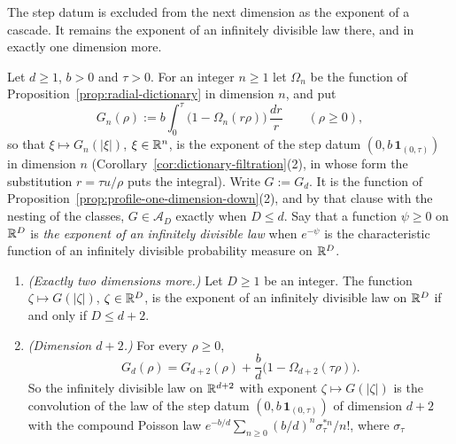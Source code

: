 The step datum is excluded from the next dimension as the exponent of a cascade. It remains the
exponent of an infinitely divisible law there, and in exactly one dimension more.

\begin{proposition}\label{prop:step-exponent-dimensions}
Let $d \ge 1$, $b > 0$ and $\tau > 0$. For an integer $n \ge 1$ let $\Omega_n$ be the function of
Proposition~\ref{prop:radial-dictionary} in dimension $n$, and put
\[
  G_n(\rho) := b\int_0^\tau \bigl(1 - \Omega_n(r\rho)\bigr)\,\frac{dr}{r} \qquad (\rho \ge 0) ,
\]
so that $\xi \mapsto G_n(|\xi|)$, $\xi \in \mathbb{R}^n$, is the exponent of the step datum
$(0, b\,\mathbf 1_{(0,\tau)})$ in dimension $n$ (Corollary~\ref{cor:dictionary-filtration}(2), in whose
form the substitution $r = \tau u/\rho$ puts the integral). Write
$G := G_d$. It is the function of Proposition~\ref{prop:profile-one-dimension-down}(2), and by that clause
with the nesting of the classes, $G \in \mathcal{A}_D$ exactly when $D \le d$. Say that a
function $\psi \ge 0$ on $\mathbb{R}^D$ is \emph{the exponent of an infinitely divisible law} when
$e^{-\psi}$ is the characteristic function of an infinitely divisible probability measure on
$\mathbb{R}^D$.
\begin{enumerate}
\item \emph{(Exactly two dimensions more.)} Let $D \ge 1$ be an integer. The function
$\zeta \mapsto G(|\zeta|)$, $\zeta \in \mathbb{R}^D$, is the exponent of an infinitely divisible law on
$\mathbb{R}^D$ if and only if $D \le d + 2$.
\item \emph{(Dimension $d + 2$.)} For every $\rho \ge 0$,
\begin{equation}\label{eq:step-exponent-two-up}
  G_d(\rho) = G_{d+2}(\rho) + \frac{b}{d}\bigl(1 - \Omega_{d+2}(\tau\rho)\bigr) .
\end{equation}
So the infinitely divisible law on $\mathbb{R}^{d+2}$ with exponent $\zeta \mapsto G(|\zeta|)$ is the
convolution of the law of the step datum $(0, b\,\mathbf 1_{(0,\tau)})$ of dimension $d + 2$ with
the compound Poisson law $e^{-b/d}\sum_{n \ge 0}(b/d)^n\sigma_\tau^{*n}/n!$, where $\sigma_\tau$

\end{enumerate}
\end{proposition}
